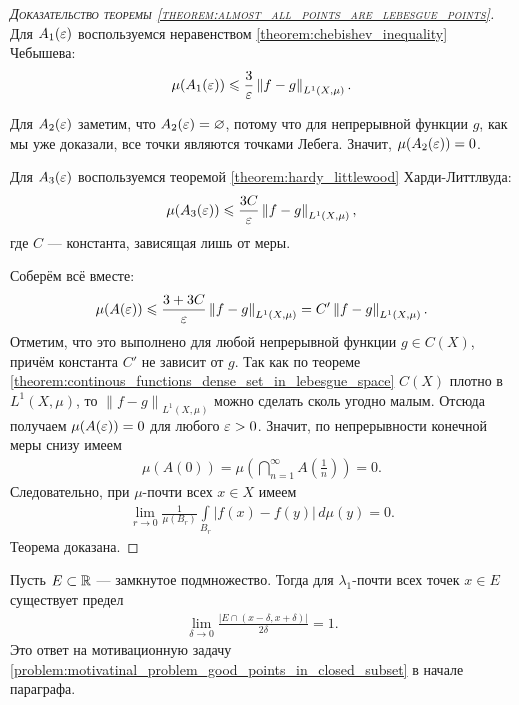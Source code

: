 \begin{proof}[\normalfont\textsc{Доказательство теоремы \ref{theorem:almost_all_points_are_lebesgue_points}}]
 Для $A_1(\varepsilon)$ воспользуемся неравенством \ref{theorem:chebishev_inequality} Чебышева: \begin{align*}
  \mu(A_1(\varepsilon)) \leqslant \frac{3}{\varepsilon} \left\| f-g \right\|_{L^{1}(X,\mu)}
 .\end{align*}

 Для $A_2(\varepsilon)$ заметим, что $A_2(\varepsilon) = \varnothing$, потому что для непрерывной функции $g$, как мы уже доказали, все точки являются точками Лебега. Значит, $\mu(A_2(\varepsilon)) = 0$.

  Для $A_3(\varepsilon)$ воспользуемся теоремой \ref{theorem:hardy_littlewood} Харди-Литтлвуда: \begin{align*}
   \mu(A_3(\varepsilon)) \leqslant \frac{3C}{\varepsilon} \left\| f-g \right\|_{L^{1}(X,\mu)}
  ,\end{align*} где $C$ --- константа, зависящая лишь от меры.

  Соберём всё вместе:
  \begin{align*}
   \mu(A(\varepsilon)) \leqslant \frac{3 + 3C}{\varepsilon} \left\| f - g \right\|_{L^{1}(X,\mu)} = C' \left\| f-g \right\|_{L^{1}(X,\mu)}
   .\end{align*} Отметим, что это выполнено для любой непрерывной функции $g \in C(X)$, причём константа $C'$ не зависит от $g$. Так как по теореме \ref{theorem:continous_functions_dense_set_in_lebesgue_space} $C(X)$ плотно в  $L^{1}(X,\mu)$, то $\left\| f-g \right\|_{L^{1}(X,\mu)}$  можно сделать сколь угодно малым. Отсюда получаем $\mu(A(\varepsilon)) = 0$ для любого  $\varepsilon > 0$. Значит, по непрерывности конечной меры снизу имеем \begin{align*}
   \mu(A(0)) = \mu \left( \bigcap_{n=1}^{\infty} A\left(\frac{1}{n}\right) \right) = 0
  .\end{align*} Следовательно, при $\mu$-почти всех $x \in X$  имеем \begin{align*}
  \lim_{r \to 0} \frac{1}{\mu(B_r)} \int\limits_{B_r} \left| f(x) - f(y) \right| \, d\mu  (y) = 0
  .\end{align*} Теорема доказана.

\end{proof}
\begin{crly}
 Пусть $E \subset \mathbb{R}$ --- замкнутое подмножество. Тогда для $\lambda_1$-почти всех точек $x \in E$ существует предел \begin{align*}
  \lim_{\delta \to 0} \frac{\left| E \cap (x - \delta, x + \delta) \right|}{2\delta} = 1
 .\end{align*} Это ответ на мотивационную задачу \ref{problem:motivatinal_problem_good_points_in_closed_subset} в начале параграфа.
\end{crly}
